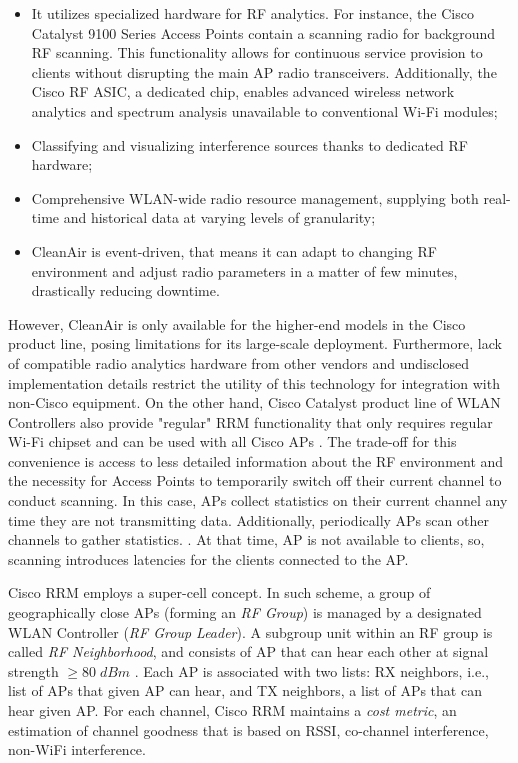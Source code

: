 \begin{itemize}
    \item It utilizes specialized hardware for RF analytics. For instance, the Cisco Catalyst 9100 Series Access Points contain a scanning radio for background RF scanning. This functionality allows for continuous service provision to clients without disrupting the main AP radio transceivers. Additionally, the Cisco RF ASIC, a dedicated chip, enables advanced wireless network analytics and spectrum analysis unavailable to conventional Wi-Fi modules;
    \item Classifying and visualizing interference sources thanks to dedicated RF hardware;
    \item Comprehensive WLAN-wide radio resource management, supplying both real-time and historical data at varying levels of granularity;
    \item CleanAir is event-driven, that means it can adapt to changing RF environment and adjust radio parameters in a matter of few minutes, drastically reducing downtime.
\end{itemize}
However, CleanAir is only available for the higher-end models in the Cisco product line, posing limitations for its large-scale deployment. Furthermore, lack of compatible radio analytics hardware from other vendors and undisclosed implementation details restrict the utility of this technology for integration with non-Cisco equipment.
On the other hand, Cisco Catalyst product line of WLAN Controllers also provide "regular" RRM functionality that only requires regular Wi-Fi chipset and can be used with all Cisco APs \cite{ciscoRadioResourceManagement}. The trade-off for this convenience is access to less detailed information about the RF environment and the necessity for Access Points to temporarily switch off their current channel to conduct scanning. In this case, APs collect statistics on their current channel any time they are not transmitting data. Additionally, periodically APs scan other channels to gather statistics. \cite{arenaUnderstandingTroubleshootingCisco2022}. At that time, AP is not available to clients, so, scanning introduces latencies for the clients connected to the AP.

Cisco RRM employs a super-cell concept. In such scheme, a group of geographically close APs (forming an \textit{RF Group}) is managed by a designated WLAN Controller (\textit{RF Group Leader}).
A subgroup unit within an RF group is called \textit{RF Neighborhood}, and consists of AP that can hear each other at signal strength $\geq 80 \; dBm$ \cite{arenaUnderstandingTroubleshootingCisco2022}. Each AP is associated with two lists: RX neighbors, i.e., list of APs that given AP can hear, and TX neighbors, a list of APs that can hear given AP.
For each channel, Cisco RRM maintains a \textit{cost metric}, an estimation of channel goodness that is based on RSSI, co-channel interference, non-WiFi interference.


